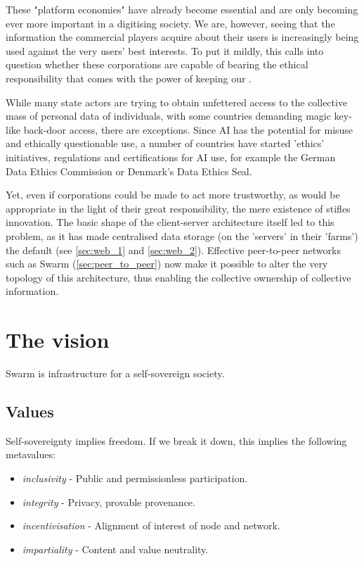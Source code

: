 These "platform economies" have already become essential and are only becoming ever more important in a digitising society. We are, however, seeing that the information the commercial players acquire about their users is increasingly being used against the very users' best interests. To put it mildly, this calls into question whether these corporations are capable of bearing the ethical responsibility that comes with the power of keeping our .

While many state actors are trying to obtain unfettered access to the collective mass of personal data of individuals, with some countries demanding magic key-like back-door access, there are exceptions. Since AI has the potential for misuse and ethically questionable use, a number of countries have started 'ethics' initiatives, regulations and certifications for AI use, for example the German Data Ethics Commission or Denmark's Data Ethics Seal. 

Yet, even if corporations could be made to act more trustworthy, as would be appropriate in the light of their great responsibility, the mere existence of  stifles innovation. The basic shape of the client-server architecture itself  led to this problem, as it has made centralised data storage (on the 'servers' in their 'farms') the default (see \ref{sec:web_1} and \ref{sec:web_2}). Effective peer-to-peer networks such as Swarm (\ref{sec:peer_to_peer}) now make it possible to alter the very topology of this architecture, thus enabling the collective ownership of collective information. 


\section{The vision  \statusorange}\label{sec:vision}

\begin{displayquote}
Swarm is infrastructure for a self-sovereign society. 
\end{displayquote}


\subsection{Values \statusorange}\label{sec:values}

Self-sovereignty implies freedom. If we break it down, this implies the following metavalues: 

\begin{itemize}[noitemsep]
\item \emph{inclusivity} - Public and permissionless participation.  
\item \emph{integrity} - Privacy, provable provenance. 
\item \emph{incentivisation} - Alignment of interest of node and network.
\item \emph{impartiality} -  Content and value neutrality.  
\end{itemize}


